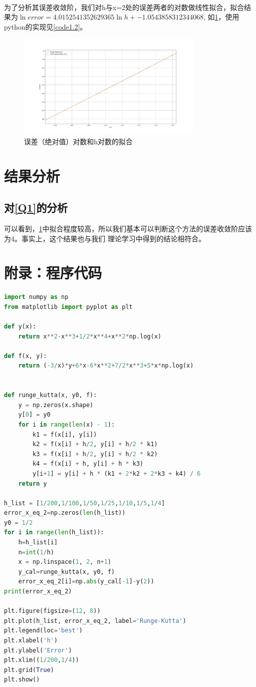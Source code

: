 \documentclass[a4paper,11pt,notitlepage]{article}
\begin{document}
\\ \indent 为了分析其误差收敛阶，我们对h与x=2处的误差两者的对数做线性拟合，拟合结果为$\ln error = 4.0152541352629365\ln h + -1.0543858312344068$,
如\cref{pic:2}，使用python的实现见\cref{code1.2}。
\begin{figure}[H]
    \centering
    \includegraphics[width=0.8\textwidth]{../picture/Final exam extra.png}
    \caption{误差（绝对值）对数和h对数的拟合}
    \label{pic:2}
\end{figure}
\section{结果分析}
\subsection{对\ref{Q1}的分析}
可以看到，\cref{pic:2}中拟合程度较高，所以我们基本可以判断这个方法的误差收敛阶应该为4。事实上，这个结果也与我们
理论学习中得到的结论相符合。
\section{附录：程序代码}
\begin{lstlisting}[language=Python,caption={Final exam1.py},label={code1.1}]
import numpy as np
from matplotlib import pyplot as plt

def y(x):
    return x**2-x**3+1/2*x**4+x**2*np.log(x)

def f(x, y):
    return (-3/x)*y+6*x-6*x**2+7/2*x**3+5*x*np.log(x)


def runge_kutta(x, y0, f):
    y = np.zeros(x.shape)
    y[0] = y0
    for i in range(len(x) - 1):
        k1 = f(x[i], y[i])
        k2 = f(x[i] + h/2, y[i] + h/2 * k1)
        k3 = f(x[i] + h/2, y[i] + h/2 * k2)
        k4 = f(x[i] + h, y[i] + h * k3)
        y[i+1] = y[i] + h * (k1 + 2*k2 + 2*k3 + k4) / 6
    return y

h_list = [1/200,1/100,1/50,1/25,1/10,1/5,1/4]
error_x_eq_2=np.zeros(len(h_list))
y0 = 1/2
for i in range(len(h_list)):
    h=h_list[i]
    n=int(1/h)
    x = np.linspace(1, 2, n+1)
    y_cal=runge_kutta(x, y0, f)
    error_x_eq_2[i]=np.abs(y_cal[-1]-y(2))
print(error_x_eq_2)

plt.figure(figsize=(12, 8))
plt.plot(h_list, error_x_eq_2, label='Runge-Kutta')
plt.legend(loc='best')
plt.xlabel('h')
plt.ylabel('Error')
plt.xlim((1/200,1/4))
plt.grid(True)
plt.show()       
\end{lstlisting}
\end{document}
